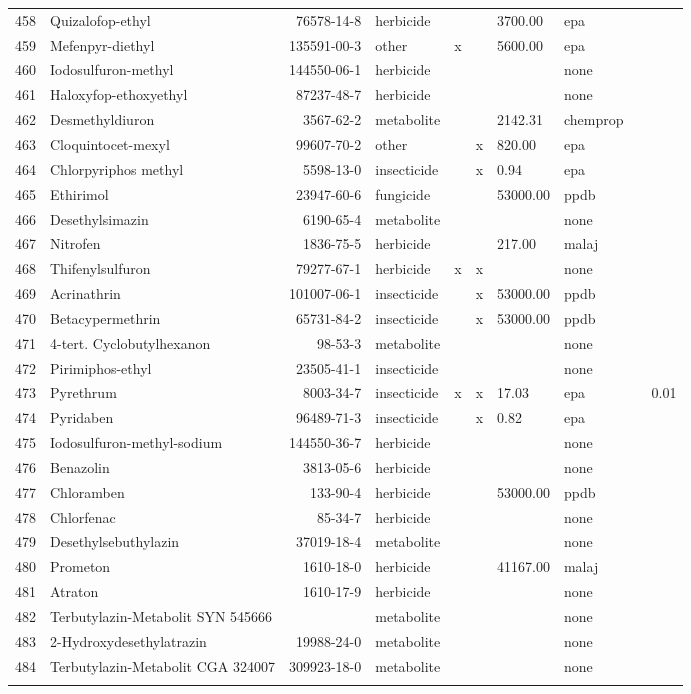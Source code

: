 \begin{longtable}{lp{3cm}rlp{0.5cm}p{0.5cm}p{1cm}p{1cm}p{1cm}p{1cm}}
  458 & Quizalofop-ethyl & 76578-14-8 & herbicide &  &  & 3700.00 & epa &  &  \\ 
  459 & Mefenpyr-diethyl & 135591-00-3 & other & x &  & 5600.00 & epa &  &  \\ 
  460 & Iodosulfuron-methyl & 144550-06-1 & herbicide &  &  &  & none &  &  \\ 
  461 & Haloxyfop-ethoxyethyl & 87237-48-7 & herbicide &  &  &  & none &  &  \\ 
  462 & Desmethyldiuron & 3567-62-2 & metabolite &  &  & 2142.31 & chemprop &  &  \\ 
  463 & Cloquintocet-mexyl & 99607-70-2 & other &  & x & 820.00 & epa &  &  \\ 
  464 & Chlorpyriphos methyl & 5598-13-0 & insecticide &  & x & 0.94 & epa &  &  \\ 
  465 & Ethirimol & 23947-60-6 & fungicide &  &  & 53000.00 & ppdb &  &  \\ 
  466 & Desethylsimazin & 6190-65-4 & metabolite &  &  &  & none &  &  \\ 
  467 & Nitrofen & 1836-75-5 & herbicide &  &  & 217.00 & malaj &  &  \\ 
  468 & Thifenylsulfuron & 79277-67-1 & herbicide & x & x &  & none &  &  \\ 
  469 & Acrinathrin & 101007-06-1 & insecticide &  & x & 53000.00 & ppdb &  &  \\ 
  470 & Betacypermethrin & 65731-84-2 & insecticide &  & x & 53000.00 & ppdb &  &  \\ 
  471 & 4-tert. Cyclobutylhexanon & 98-53-3 & metabolite &  &  &  & none &  &  \\ 
  472 & Pirimiphos-ethyl & 23505-41-1 & insecticide &  &  &  & none &  &  \\ 
  473 & Pyrethrum & 8003-34-7 & insecticide & x & x & 17.03 & epa &  & 0.01 \\ 
  474 & Pyridaben & 96489-71-3 & insecticide &  & x & 0.82 & epa &  &  \\ 
  475 & Iodosulfuron-methyl-sodium & 144550-36-7 & herbicide &  &  &  & none &  &  \\ 
  476 & Benazolin & 3813-05-6 & herbicide &  &  &  & none &  &  \\ 
  477 & Chloramben & 133-90-4 & herbicide &  &  & 53000.00 & ppdb &  &  \\ 
  478 & Chlorfenac & 85-34-7 & herbicide &  &  &  & none &  &  \\ 
  479 & Desethylsebuthylazin & 37019-18-4 & metabolite &  &  &  & none &  &  \\ 
  480 & Prometon & 1610-18-0 & herbicide &  &  & 41167.00 & malaj &  &  \\ 
  481 & Atraton & 1610-17-9 & herbicide &  &  &  & none &  &  \\ 
  482 & Terbutylazin-Metabolit SYN 545666 &  & metabolite &  &  &  & none &  &  \\ 
  483 & 2-Hydroxydesethylatrazin & 19988-24-0 & metabolite &  &  &  & none &  &  \\ 
  484 & Terbutylazin-Metabolit CGA 324007 & 309923-18-0 & metabolite &  &  &  & none &  &  \\ 
  \label{tab:phch_var}
\end{longtable}
\endgroup
